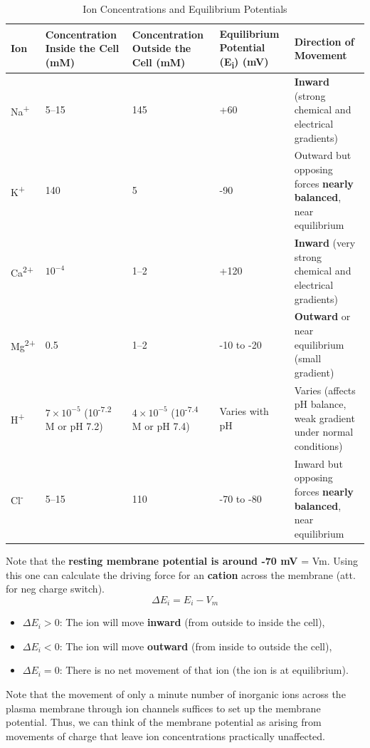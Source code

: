 \documentclass[../main.tex]{subfiles}
\begin{document}
\begin{table}[h!]
	\centering
	\begin{tabular}{|l|p{3.5cm}|p{3.5cm}|p{3cm}|p{3.5cm}|}
		\hline
		\textbf{Ion} & \textbf{Concentration Inside the Cell (mM)} & \textbf{Concentration Outside the Cell (mM)} & \textbf{Equilibrium Potential (E\textsubscript{i}) (mV)} & \textbf{Direction of Movement} \\ \hline
		Na\textsuperscript{+} & 5--15 & 145 & +60 & \textbf{Inward} (strong chemical and electrical gradients) \\ \hline
		K\textsuperscript{+}  & 140 & 5 & -90 & Outward but opposing forces \textbf{nearly balanced}, near equilibrium \\ \hline
		Ca\textsuperscript{2+} & $10^{-4}$ & 1--2 & +120 & \textbf{Inward} (very strong chemical and electrical gradients) \\ \hline
		Mg\textsuperscript{2+} & 0.5 & 1--2 & -10 to -20 & \textbf{Outward} or near equilibrium (small gradient) \\ \hline
		H\textsuperscript{+} & $7 \times 10^{-5}$ (10\textsuperscript{-7.2} M or pH 7.2) & $4 \times 10^{-5}$ (10\textsuperscript{-7.4} M or pH 7.4) & Varies with pH & Varies (affects pH balance, weak gradient under normal conditions) \\ \hline
		Cl\textsuperscript{-} & 5--15 & 110 & -70 to -80 & Inward but opposing forces \textbf{nearly balanced}, near equilibrium  \\ \hline
	\end{tabular}
	\caption{Ion Concentrations and Equilibrium Potentials}
	\label{tableconc}  %
\end{table}
Note that the \textbf{resting membrane potential is around -70 mV} = Vm.  Using this one can calculate the driving force for an \textbf{cation }across the membrane (att. for neg charge switch). 
\[
\Delta E_i = E_i - V_m
\]
\begin{itemize}
	\item \( \Delta E_i > 0 \): The ion will move \textbf{inward} (from outside to inside the cell),
	\item \( \Delta E_i < 0 \): The ion will move \textbf{outward} (from inside to outside the cell),
	\item \( \Delta E_i = 0 \): There is no net movement of that ion (the ion is at equilibrium).
\end{itemize}

Note that the movement of only a minute number of inorganic ions across the plasma membrane through ion channels suffices to set up the membrane potential. Thus, we can think of the membrane potential as arising from movements of charge that leave ion concentrations practically unaffected.  
\end{document}

